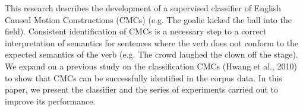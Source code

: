 This research describes the development of a supervised classifier of English Caused Motion Constructions (CMCs) (e.g. The goalie kicked the ball into the field). Consistent identification of CMCs is a necessary step to a correct interpretation of semantics for sentences where the verb does not conform to the expected semantics of the verb (e.g. The crowd laughed the clown off the stage). We expand on a previous study on the classification CMCs (Hwang et al., 2010) to show that CMCs can be successfully identified in the corpus data. In this paper, we present the classifier and the series of experiments carried out to improve its performance.
